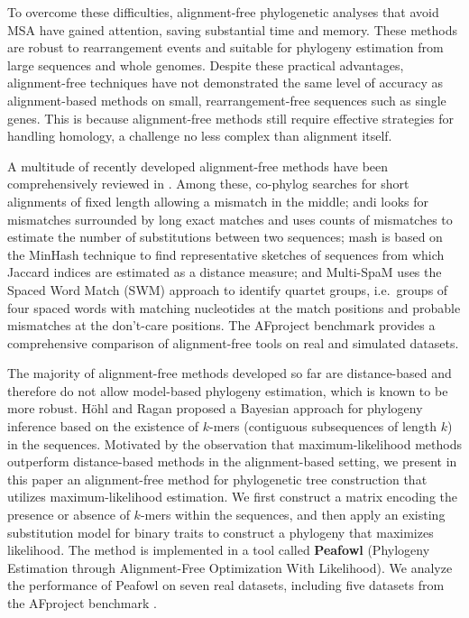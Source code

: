 \documentclass[11pt]{article}
\begin{document}
To overcome these difficulties, alignment-free phylogenetic analyses that avoid MSA have gained attention, saving substantial time and memory. These methods are robust to rearrangement events and suitable for phylogeny estimation from large sequences and whole genomes. Despite these practical advantages, alignment-free techniques have not demonstrated the same level of accuracy as alignment-based methods on small, rearrangement-free sequences such as single genes. This is because alignment-free methods still require effective strategies for handling homology, a challenge no less complex than alignment itself.

A multitude of recently developed alignment-free methods have been comprehensively reviewed in \cite{zielezinski2017afreview,bernard2019afreview}. Among these, co-phylog \cite{yi2013cophylog} searches for short alignments of fixed length allowing a mismatch in the middle; andi \cite{haubold2015andi} looks for mismatches surrounded by long exact matches and uses counts of mismatches to estimate the number of substitutions between two sequences; mash \cite{ondov2016mash} is based on the MinHash technique to find representative sketches of sequences from which Jaccard indices are estimated as a distance measure; and Multi-SpaM \cite{dencker2020multispam} uses the Spaced Word Match (SWM) approach \cite{leimeister2017spacedwords} to identify quartet groups, i.e.\ groups of four spaced words with matching nucleotides at the match positions and probable mismatches at the don't-care positions. The AFproject benchmark \cite{zielezinski2019afproject} provides a comprehensive comparison of alignment-free tools on real and simulated datasets.

The majority of alignment-free methods developed so far are distance-based and therefore do not allow model-based phylogeny estimation, which is known to be more robust. H{\"o}hl and Ragan \cite{hohl2007bayesian} proposed a Bayesian approach for phylogeny inference based on the existence of $k$-mers (contiguous subsequences of length $k$) in the sequences. Motivated by the observation that maximum-likelihood methods outperform distance-based methods in the alignment-based setting, we present in this paper an alignment-free method for phylogenetic tree construction that utilizes maximum-likelihood estimation. We first construct a matrix encoding the presence or absence of $k$-mers within the sequences, and then apply an existing substitution model for binary traits to construct a phylogeny that maximizes likelihood. The method is implemented in a tool called \textbf{Peafowl} (Phylogeny Estimation through Alignment-Free Optimization With Likelihood). We analyze the performance of Peafowl on seven real datasets, including five datasets from the AFproject benchmark \cite{zielezinski2019afproject}.
\end{document}
